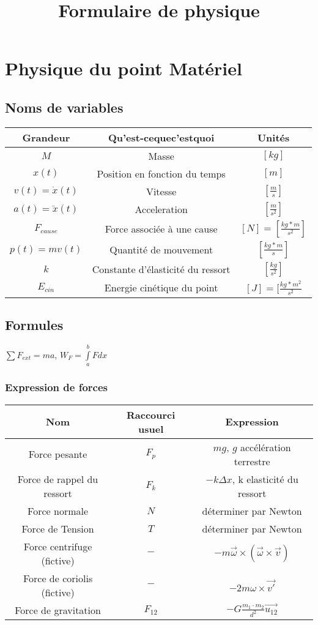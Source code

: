 \documentclass[10pt,a4paper]{article}
\title{Formulaire de physique}
\begin{document}
\section{Physique du point Matériel}

\subsection{Noms de variables}

\begin{tabular}{|c|c|c|}
\hline 
Grandeur & Qu'est-cequec'estquoi & Unités \\ 
\hline 
$M$ & Masse & $[kg]$ \\
\hline
$x(t)$ & Position en fonction du temps & $[m]$ \\ 
\hline
$v(t) = \dot{x}(t)$ & Vitesse & $[\frac{m}{s}]$ \\
\hline

$a(t) = \ddot{x}(t)$ & Acceleration & $[\frac{m}{s^2}]$ \\

\hline
$F_{cause}$ & Force associée à une cause & $[N] = [\frac{kg*m}{s^2}]$ \\
\hline
$p(t) = mv(t)$ & Quantité de mouvement & $[\frac{kg*m}{s}]$ \\
\hline
$k$ & Constante d'élasticité du ressort & $[\frac{kg}{s^2}]$\\
\hline
$E_{cin}$ & Energie cinétique du point & $[J] = [\frac{kg*m^2}{s^2}$ \\
\hline
\end{tabular}

\subsection{Formules}


$\sum F_{ext} = ma$, $W_F = \int\limits_a^b F dx$

\subsubsection{Expression de forces}

\begin{tabular}{c|c|c}
Nom & Raccourci usuel & Expression \\
\hline
Force pesante & $F_p$ & $mg$, $g$ accélération terrestre \\
Force de rappel du ressort & $F_k$ & $-k\Delta x$, k elasticité du ressort\\
Force normale & $N$ & déterminer par Newton \\
Force de Tension & $T$ & déterminer par Newton \\
Force centrifuge (fictive) & $-$ & $-m\vec\omega \times (\vec\omega \times \vec v)$ \\
Force de coriolis (fictive) & $-$ & $-2m\omega \times \vec{v'}$ \\
Force de gravitation & $F_{12}$ & $-G\frac{m_1 \cdot m_2}{d^2}\vec{u_{12}}$

\end{tabular}
\end{document}
